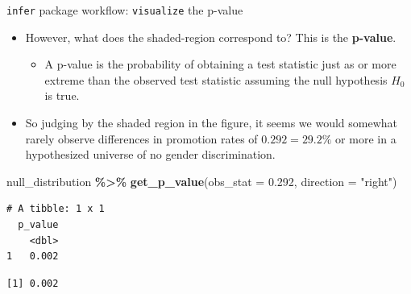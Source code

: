 \documentclass[
  ignorenonframetext,
]{beamer}
\newenvironment{Shaded}{\begin{snugshade}}{\end{snugshade}}
\newcommand{\AttributeTok}[1]{\textcolor[rgb]{0.13,0.29,0.53}{#1}}
\newcommand{\CommentTok}[1]{\textcolor[rgb]{0.56,0.35,0.01}{\textit{#1}}}
\newcommand{\FloatTok}[1]{\textcolor[rgb]{0.00,0.00,0.81}{#1}}
\newcommand{\FunctionTok}[1]{\textcolor[rgb]{0.13,0.29,0.53}{\textbf{#1}}}
\newcommand{\NormalTok}[1]{#1}
\newcommand{\SpecialCharTok}[1]{\textcolor[rgb]{0.81,0.36,0.00}{\textbf{#1}}}
\newcommand{\StringTok}[1]{\textcolor[rgb]{0.31,0.60,0.02}{#1}}
\providecommand{\tightlist}{%
  \setlength{\itemsep}{0pt}\setlength{\parskip}{0pt}}
\begin{document}
\begin{frame}[fragile]{\texttt{infer} package workflow:
\texttt{visualize} the p-value}
\protect\hypertarget{infer-package-workflow-visualize-the-p-value-1}{}
\begin{itemize}
\item
  However, what does the shaded-region correspond to? This is the
  \textbf{p-value}.

  \begin{itemize}
  \tightlist
  \item
    A p-value is the probability of obtaining a test statistic just as
    or more extreme than the observed test statistic assuming the null
    hypothesis \(H_0\) is true.
  \end{itemize}
\item
  So judging by the shaded region in the figure, it seems we would
  somewhat rarely observe differences in promotion rates of
  \(0.292 = 29.2\%\) or more in a hypothesized universe of no gender
  discrimination.
\end{itemize}

\tiny

\begin{Shaded}
\begin{Highlighting}[]
\NormalTok{null\_distribution }\SpecialCharTok{\%\textgreater{}\%} 
  \FunctionTok{get\_p\_value}\NormalTok{(}\AttributeTok{obs\_stat =} \FloatTok{0.292}\NormalTok{, }\AttributeTok{direction =} \StringTok{"right"}\NormalTok{) }
\end{Highlighting}
\end{Shaded}

\begin{verbatim}
# A tibble: 1 x 1
  p_value
    <dbl>
1   0.002
\end{verbatim}

\begin{Shaded}
\end{Shaded}

\begin{verbatim}
[1] 0.002
\end{verbatim}

\normalsize
\end{frame}
\end{document}
